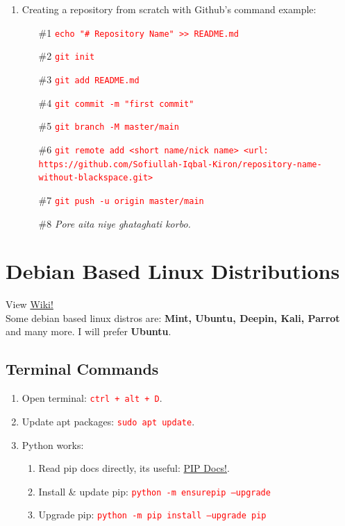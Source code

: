 \documentclass[12 pt, letterpaper]{extarticle}
\newcommand{\R}{\textcolor{red}} %
\newcommand{\T}{\texttt}
\begin{document}
\begin{enumerate}
	\item Creating a repository from scratch with Github's command example:
	      \begin{enumerate}
		      \item[\#1] \R{\T{echo "\# Repository Name" >> README.md}}
		      \item[\#2] \R{\T{git init}}
		      \item[\#3] \R{\T{git add README.md}}
		      \item[\#4] \R{\T{git commit -m "first commit"}}
		      \item[\#5] \R{\T{git branch -M master/main}}
		      \item[\#6] \R{\T{\footnotesize git remote add <short name/nick name> <url:\\https://github.com/Sofiullah-Iqbal-Kiron/repository-name-without-blackspace.git>}}
		      \item[\#7] \R{\T{git push -u origin master/main}}
		      \item[\#8] \textit{Pore aita niye ghataghati korbo.}
	      \end{enumerate}

\end{enumerate}


\section*{Debian Based Linux Distributions}

View \href{https://en.wikipedia.org/wiki/Debian}{Wiki!} \\
Some debian based linux distros are: \textbf{Mint, Ubuntu, Deepin, Kali, Parrot} and many more. I will prefer \textbf{Ubuntu}.

\subsection*{Terminal Commands}
\begin{enumerate}
	\item Open terminal: \R{\T{ctrl + alt + D}}.
	\item Update apt packages: \R{\T{sudo apt update}}.
	\item Python works:
	      \begin{enumerate}
		      \item Read pip docs directly, its useful: \href{https://pip.pypa.io/en/stable/}{PIP Docs!}.
		      \item Install \& update pip: \R{\T{python -m ensurepip --upgrade}}
		      \item Upgrade pip: \R{\T{python -m pip install --upgrade pip}}
	      \end{enumerate}
\end{enumerate}
\end{document}
